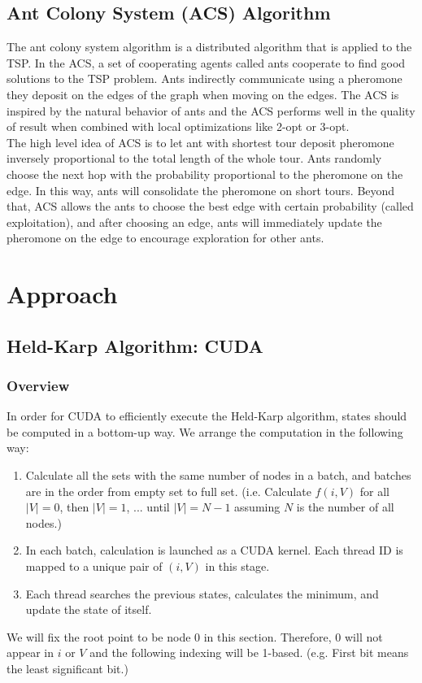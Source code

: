 \documentclass{article}
\begin{document}
\subsection{Ant Colony System (ACS) Algorithm}
    The ant colony system algorithm is a distributed algorithm that is applied to the TSP\cite{acs}. In the ACS, a set of cooperating agents called ants cooperate to find good solutions to the TSP problem. Ants indirectly communicate using a pheromone they deposit on the edges of the graph when moving on the edges. The ACS is inspired by the natural behavior of ants and the ACS performs well in the quality of result when combined with local optimizations like 2-opt or 3-opt.\\
    
    The high level idea of ACS is to let ant with shortest tour deposit pheromone inversely proportional to the total length of the whole tour. Ants randomly choose the next hop with the probability proportional to the pheromone on the edge. In this way, ants will consolidate the pheromone on short tours. Beyond that, ACS allows the ants to choose the best edge with certain probability (called exploitation), and after choosing an edge, ants will immediately update the pheromone on the edge to encourage exploration for other ants. 
\section{Approach}
\subsection{Held-Karp Algorithm: CUDA}
\subsubsection{Overview}
    In order for CUDA to efficiently execute the Held-Karp algorithm, states should be computed in a bottom-up way. We arrange the computation in the following way:
    \begin{enumerate}
        \item Calculate all the sets with the same number of nodes in a batch, and batches are in the order from empty set to full set. (i.e. Calculate $f(i, V)$ for all $|V| = 0$, then $|V| = 1$, ... until $|V| = N - 1$ assuming $N$ is the number of all nodes.)
        \item In each batch, calculation is launched as a CUDA kernel. Each thread ID is mapped to a unique pair of $(i, V)$ in this stage.
        \item Each thread searches the previous states, calculates the minimum, and update the state of itself.
    \end{enumerate}
    We will fix the root point to be node 0 in this section. Therefore, 0 will not appear in $i$ or $V$ and the following indexing will be 1-based. (e.g. First bit means the least significant bit.)
\end{document}
